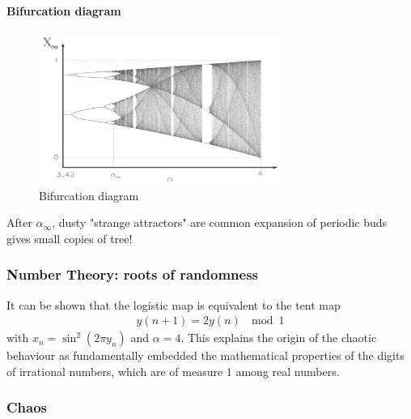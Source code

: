 \pagebreak

\paragraph{Bifurcation diagram}

\begin{figure}[H]
    \centering
    \includegraphics[width=0.7\textwidth]{Pictures/logistic_map_bifurcation_diagram.png}
    \caption{Bifurcation diagram}
\end{figure}

After $\alpha_\infty$, dusty "strange attractors" are common expansion of periodic
buds gives small copies of tree!


\subsubsection{Number Theory: roots of randomness}

It can be shown that the logistic map is equivalent to the tent map
\begin{align*}
    y(n+1) = 2y(n) \ \mod{1}
\end{align*}
with $x_n = \sin^2(2 \pi y_n)$ and $\alpha = 4$.
This explains the origin of the chaotic behaviour as fundamentally
embedded the mathematical properties of the digits of irrational numbers,
which are of measure $1$ among real numbers.

\subsubsection{Chaos}


